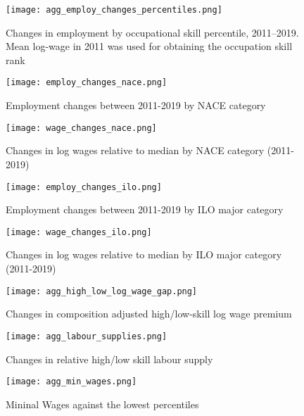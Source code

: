 \documentclass{article}
\begin{document}
\begin{figure}[!htbp]%
    \centering
    {\texttt{[image: agg\_employ\_changes\_percentiles.png]} }
    \caption{Changes in employment by occupational skill percentile, 2011–2019. Mean log-wage in 2011 was used for obtaining the occupation skill rank}
    \label{agg_employ_changes_percentiles}
\end{figure}

\begin{figure}[!htbp]%
\centering
    {\texttt{[image: employ\_changes\_nace.png]} }
    \caption{Employment changes between 2011-2019 by NACE category}
\label{employ_changes_nace}
\end{figure}

\begin{figure}[!htbp]%
\centering
    {\texttt{[image: wage\_changes\_nace.png]} }
    \caption{Changes in log wages relative to median by NACE category (2011-2019)}
\label{wage_changes_nace}
\end{figure}

\begin{figure}[!htbp]%
\centering
    {\texttt{[image: employ\_changes\_ilo.png]} }
    \caption{Employment changes between 2011-2019 by ILO major category}
\label{employ_changes_ilo}
\end{figure}

\begin{figure}[!htbp]%
\centering
    {\texttt{[image: wage\_changes\_ilo.png]} }
    \caption{Changes in log wages relative to median by ILO major category (2011-2019)}
\label{wage_changes_ilo}
\end{figure}

\begin{figure}[!htbp]%
    \centering
    {\texttt{[image: agg\_high\_low\_log\_wage\_gap.png]} }
    \caption{Changes in composition adjusted high/low-skill log wage premium}
    \label{agg_high_low_log_wage_gap}
\end{figure}


\begin{figure}[!htbp]%
    \centering
    {\texttt{[image: agg\_labour\_supplies.png]} }
    \caption{Changes in relative high/low skill labour supply}
    \label{agg_labour_supplies}
\end{figure}


\begin{figure}[!htbp]%
    \centering
    {\texttt{[image: agg\_min\_wages.png]} }
    \caption{Mininal Wages against the lowest percentiles}
    \label{agg_labour_supplies}
\end{figure}
\end{document}
